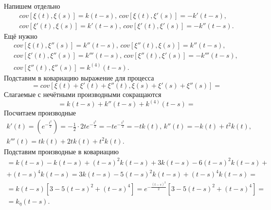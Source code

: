 Напишем отдельно
\begin{gather*}
  cov \left[ \xi \left( t \right), \xi \left( s \right) \right] =
  k \left( t - s \right), \,
  cov \left[ \xi \left( t \right), \xi' \left( s \right) \right] =
  -k' \left( t - s \right), \, \\
  cov \left[ \xi' \left( t \right), \xi \left( s \right) \right] =
  k' \left( t - s \right), \,
  cov \left[ \xi' \left( t \right), \xi' \left( s \right) \right] =
  -k'' \left( t - s \right).
\end{gather*}
Ещё нужно
\begin{gather*}
  cov \left[ \xi \left( t \right), \xi'' \left( s \right) \right] =
  k'' \left( t - s \right), \,
  cov \left[ \xi'' \left( t \right), \xi \left( s \right) \right] =
  k'' \left( t - s \right), \, \\
  cov \left[ \xi' \left( t \right), \xi'' \left( s \right) \right] =
  k''' \left( t - s \right), \,
  cov \left[ \xi'' \left( t \right), \xi' \left( s \right) \right] =
  -k''' \left( t - s \right), \, \\
  cov \left[ \xi'' \left( t \right), \xi'' \left( s \right) \right] =
  k^{ \left( 4 \right) } \left( t - s \right).
\end{gather*}
Подставим в ковариацию выражение для процесса
\begin{equation*}
  = cov \left[
    \xi \left( t \right) + \xi' \left( t \right) + \xi'' \left( t \right),
    \xi \left( s \right) + \xi' \left( s \right) + \xi'' \left( s \right)
  \right] =
\end{equation*}
Слагаемые с нечётными производными сокращаются
\begin{equation*}
  = k \left( t - s \right) + k'' \left( t - s \right) +
  k^{ \left( 4 \right) } \left( t - s \right) =
\end{equation*}
Посчитаем производные
\begin{gather*}
  k' \left( t \right) =
  \left( e^{-\frac{t^2}{2}} \right) =
  -\frac{1}{2} \cdot 2te^{-\frac{t^2}{2}} =
  -te^{-\frac{t^2}{2}} =
  -tk \left( t \right), \,
  k'' \left( t \right) = -k \left( t \right) + t^2 k \left( t \right), \, \\
  k''' \left( t \right) =
  tk \left( t \right) + 2tk \left( t \right) + t^2 k \left( t \right).
\end{gather*}
Подставим производные в ковариацию
\begin{gather*}
  = k \left( t - s \right) - k \left( t - s \right) +
  \left( t - s \right)^2 k \left( t - s \right) + 3k \left( t - s \right) -
  6 \left( t - s \right)^2 k \left( t - s \right) + \\
  + \left( t - s \right)^4 k \left( t - s \right) =
  3k \left( t - s \right) - 5 \left( t - s \right)^2 k \left( t - s \right) +
  \left( t - s \right)^4 k \left( t - s \right) = \\
  = k \left( t - s \right)
  \left[ 3 - 5 \left( t - s \right)^2 + \left( t - s \right)^4 \right] =
  e^{-\frac{ \left( t - s \right)^2}{2}}
  \left[ 3 - 5 \left( t - s \right)^2 + \left( t - s \right)^4 \right] = \\
  = k_{ \eta } \left( t - s \right).
\end{gather*}


